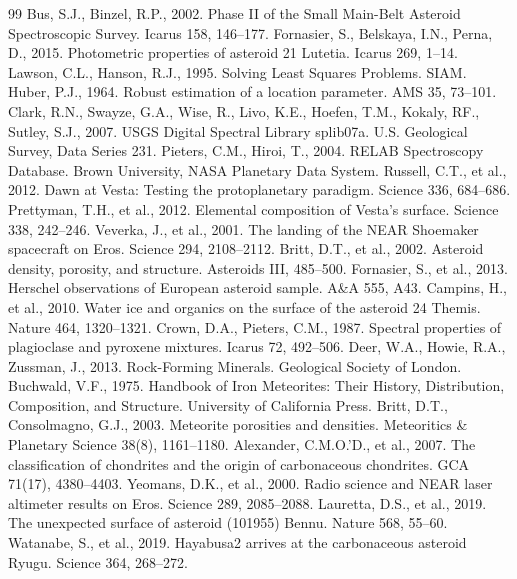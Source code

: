 \documentclass[11pt,a4paper]{article}
\begin{document}
\begin{thebibliography}{99}
 Bus, S.J., Binzel, R.P., 2002. Phase II of the Small Main-Belt Asteroid Spectroscopic Survey. Icarus 158, 146--177.
 Fornasier, S., Belskaya, I.N., Perna, D., 2015. Photometric properties of asteroid 21 Lutetia. Icarus 269, 1--14.
 Lawson, C.L., Hanson, R.J., 1995. Solving Least Squares Problems. SIAM.
 Huber, P.J., 1964. Robust estimation of a location parameter. AMS 35, 73--101.
 Clark, R.N., Swayze, G.A., Wise, R., Livo, K.E., Hoefen, T.M., Kokaly, RF., Sutley, S.J., 2007. USGS Digital Spectral Library splib07a. U.S. Geological Survey, Data Series 231.
 Pieters, C.M., Hiroi, T., 2004. RELAB Spectroscopy Database. Brown University, NASA Planetary Data System.
 Russell, C.T., et al., 2012. Dawn at Vesta: Testing the protoplanetary paradigm. Science 336, 684--686.
 Prettyman, T.H., et al., 2012. Elemental composition of Vesta's surface. Science 338, 242--246.
 Veverka, J., et al., 2001. The landing of the NEAR Shoemaker spacecraft on Eros. Science 294, 2108--2112.
 Britt, D.T., et al., 2002. Asteroid density, porosity, and structure. Asteroids III, 485--500.
 Fornasier, S., et al., 2013. Herschel observations of European asteroid sample. A\&A 555, A43.
 Campins, H., et al., 2010. Water ice and organics on the surface of the asteroid 24 Themis. Nature 464, 1320--1321.
 Crown, D.A., Pieters, C.M., 1987. Spectral properties of plagioclase and pyroxene mixtures. Icarus 72, 492--506.
 Deer, W.A., Howie, R.A., Zussman, J., 2013. Rock-Forming Minerals. Geological Society of London.
 Buchwald, V.F., 1975. Handbook of Iron Meteorites: Their History, Distribution, Composition, and Structure. University of California Press.
 Britt, D.T., Consolmagno, G.J., 2003. Meteorite porosities and densities. Meteoritics \& Planetary Science 38(8), 1161--1180.
 Alexander, C.M.O.'D., et al., 2007. The classification of chondrites and the origin of carbonaceous chondrites. GCA 71(17), 4380--4403.
 Yeomans, D.K., et al., 2000. Radio science and NEAR laser altimeter results on Eros. Science 289, 2085--2088.
 Lauretta, D.S., et al., 2019. The unexpected surface of asteroid (101955) Bennu. Nature 568, 55--60.
 Watanabe, S., et al., 2019. Hayabusa2 arrives at the carbonaceous asteroid Ryugu. Science 364, 268--272.

\end{thebibliography}
\end{document}
